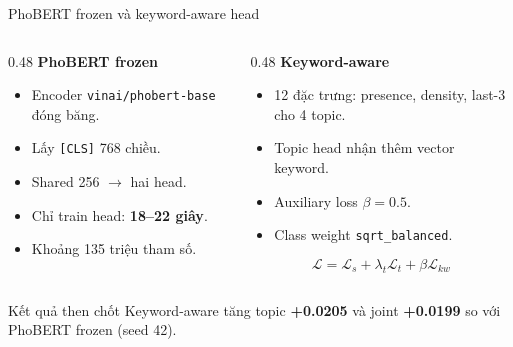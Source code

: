 \documentclass[aspectratio=169,11pt]{beamer}
\newcommand{\good}[1]{\textcolor{sgublue}{\textbf{#1}}}
\begin{document}
\begin{frame}{PhoBERT frozen và keyword-aware head}
\begin{columns}[T]
\begin{column}{0.48\textwidth}
\textbf{PhoBERT frozen}
\begin{itemize}
  \item Encoder \texttt{vinai/phobert-base} đóng băng.
  \item Lấy \texttt{[CLS]} 768 chiều.
  \item Shared 256 $\rightarrow$ hai head.
  \item Chỉ train head: \good{18--22 giây}.
  \item Khoảng 135 triệu tham số.
\end{itemize}
\end{column}
\begin{column}{0.48\textwidth}
\textbf{Keyword-aware}
\begin{itemize}
  \item 12 đặc trưng: presence, density, last-3 cho 4 topic.
  \item Topic head nhận thêm vector keyword.
  \item Auxiliary loss $\beta=0.5$.
  \item Class weight \texttt{sqrt\_balanced}.
\end{itemize}
\[
\mathcal{L} = \mathcal{L}_s + \lambda_t\mathcal{L}_t + \beta\mathcal{L}_{kw}
\]
\end{column}
\end{columns}

\vspace{0.15cm}
\begin{block}{Kết quả then chốt}
Keyword-aware tăng topic \good{+0.0205} và joint \good{+0.0199} so với PhoBERT frozen (seed 42).
\end{block}
\end{frame}
\end{document}
